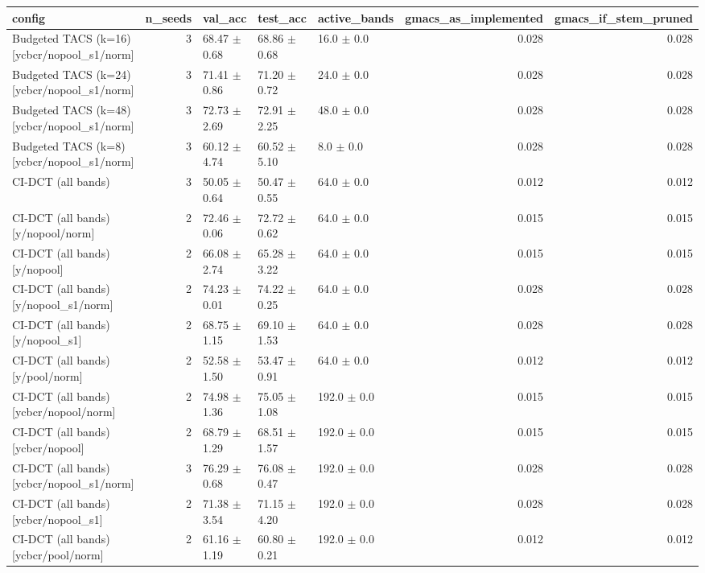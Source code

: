 \begin{tabular}{lrlllrr}
\toprule
config & n_seeds & val_acc & test_acc & active_bands & gmacs_as_implemented & gmacs_if_stem_pruned \\
\midrule
Budgeted TACS (k=16) [ycbcr/nopool_s1/norm] & 3 & 68.47 $\pm$ 0.68 & 68.86 $\pm$ 0.68 & 16.0 $\pm$ 0.0 & 0.028 & 0.028 \\
Budgeted TACS (k=24) [ycbcr/nopool_s1/norm] & 3 & 71.41 $\pm$ 0.86 & 71.20 $\pm$ 0.72 & 24.0 $\pm$ 0.0 & 0.028 & 0.028 \\
Budgeted TACS (k=48) [ycbcr/nopool_s1/norm] & 3 & 72.73 $\pm$ 2.69 & 72.91 $\pm$ 2.25 & 48.0 $\pm$ 0.0 & 0.028 & 0.028 \\
Budgeted TACS (k=8) [ycbcr/nopool_s1/norm] & 3 & 60.12 $\pm$ 4.74 & 60.52 $\pm$ 5.10 & 8.0 $\pm$ 0.0 & 0.028 & 0.028 \\
CI-DCT (all bands) & 3 & 50.05 $\pm$ 0.64 & 50.47 $\pm$ 0.55 & 64.0 $\pm$ 0.0 & 0.012 & 0.012 \\
CI-DCT (all bands) [y/nopool/norm] & 2 & 72.46 $\pm$ 0.06 & 72.72 $\pm$ 0.62 & 64.0 $\pm$ 0.0 & 0.015 & 0.015 \\
CI-DCT (all bands) [y/nopool] & 2 & 66.08 $\pm$ 2.74 & 65.28 $\pm$ 3.22 & 64.0 $\pm$ 0.0 & 0.015 & 0.015 \\
CI-DCT (all bands) [y/nopool_s1/norm] & 2 & 74.23 $\pm$ 0.01 & 74.22 $\pm$ 0.25 & 64.0 $\pm$ 0.0 & 0.028 & 0.028 \\
CI-DCT (all bands) [y/nopool_s1] & 2 & 68.75 $\pm$ 1.15 & 69.10 $\pm$ 1.53 & 64.0 $\pm$ 0.0 & 0.028 & 0.028 \\
CI-DCT (all bands) [y/pool/norm] & 2 & 52.58 $\pm$ 1.50 & 53.47 $\pm$ 0.91 & 64.0 $\pm$ 0.0 & 0.012 & 0.012 \\
CI-DCT (all bands) [ycbcr/nopool/norm] & 2 & 74.98 $\pm$ 1.36 & 75.05 $\pm$ 1.08 & 192.0 $\pm$ 0.0 & 0.015 & 0.015 \\
CI-DCT (all bands) [ycbcr/nopool] & 2 & 68.79 $\pm$ 1.29 & 68.51 $\pm$ 1.57 & 192.0 $\pm$ 0.0 & 0.015 & 0.015 \\
CI-DCT (all bands) [ycbcr/nopool_s1/norm] & 3 & 76.29 $\pm$ 0.68 & 76.08 $\pm$ 0.47 & 192.0 $\pm$ 0.0 & 0.028 & 0.028 \\
CI-DCT (all bands) [ycbcr/nopool_s1] & 2 & 71.38 $\pm$ 3.54 & 71.15 $\pm$ 4.20 & 192.0 $\pm$ 0.0 & 0.028 & 0.028 \\
CI-DCT (all bands) [ycbcr/pool/norm] & 2 & 61.16 $\pm$ 1.19 & 60.80 $\pm$ 0.21 & 192.0 $\pm$ 0.0 & 0.012 & 0.012 \\

\end{tabular}
